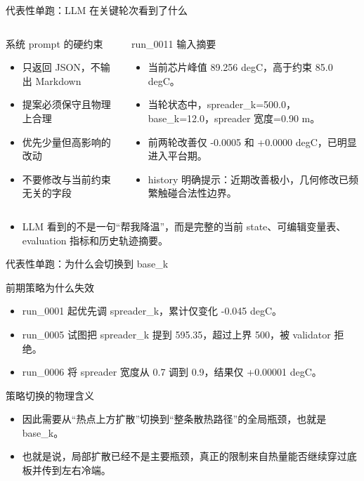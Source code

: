 \documentclass[aspectratio=169]{ctexbeamer}
\begin{document}
\begin{frame}{代表性单跑：LLM 在关键轮次看到了什么}
\small
\begin{columns}[T]
\begin{block}{系统 prompt 的硬约束}
\begin{itemize}
\item 只返回 JSON，不输出 Markdown
\item 提案必须保守且物理上合理
\item 优先少量但高影响的改动
\item 不要修改与当前约束无关的字段
\end{itemize}
\end{block}
\begin{block}{run\_0011 输入摘要}
\begin{itemize}
\item 当前芯片峰值 89.256 degC，高于约束 85.0 degC。
\item 当轮状态中，spreader\_k=500.0，base\_k=12.0，spreader 宽度=0.90 m。
\item 前两轮改善仅 -0.0005 和 +0.0000 degC，已明显进入平台期。
\item history 明确提示：近期改善极小，几何修改已频繁触碰合法性边界。
\end{itemize}
\end{block}
\end{columns}
\vspace{0.1cm}
\begin{itemize}
\item LLM 看到的不是一句“帮我降温”，而是完整的当前 state、可编辑变量表、evaluation 指标和历史轨迹摘要。
\end{itemize}
\end{frame}

\begin{frame}{代表性单跑：为什么会切换到 base\_k}
\small
\begin{block}{前期策略为什么失效}
\begin{itemize}
\item run\_0001 起优先调 spreader\_k，累计仅变化 -0.045 degC。
\item run\_0005 试图把 spreader\_k 提到 595.35，超过上界 500，被 validator 拒绝。
\item run\_0006 将 spreader 宽度从 0.7 调到 0.9，结果仅 +0.00001 degC。
\end{itemize}
\end{block}
\begin{block}{策略切换的物理含义}
\begin{itemize}
\item 因此需要从“热点上方扩散”切换到“整条散热路径”的全局瓶颈，也就是 base\_k。
\item 也就是说，局部扩散已经不是主要瓶颈，真正的限制来自热量能否继续穿过底板并传到左右冷端。
\end{itemize}
\end{block}
\end{frame}
\end{document}
